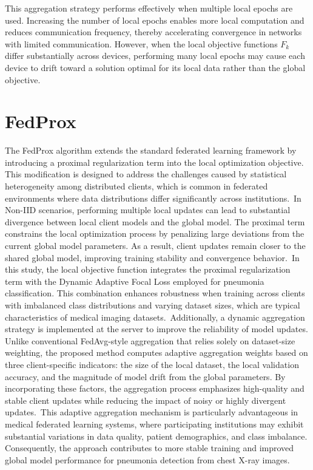 \documentclass[12pt]{book}
\begin{document}
This aggregation strategy performs effectively when multiple local epochs are used. Increasing the number of local epochs enables more local computation and reduces communication frequency, thereby accelerating convergence in networks with limited communication. However, when the local objective functions $F_k$ differ substantially across devices, performing many local epochs may cause each device to drift toward a solution optimal for its local data rather than the global objective.

\section{FedProx}

The FedProx algorithm extends the standard federated learning framework by introducing a proximal regularization term into the local optimization objective. This modification is designed to address the challenges caused by statistical heterogeneity among distributed clients, which is common in federated environments where data distributions differ significantly across institutions.\
In Non-IID scenarios, performing multiple local updates can lead to substantial divergence between local client models and the global model. The proximal term constrains the local optimization process by penalizing large deviations from the current global model parameters. As a result, client updates remain closer to the shared global model, improving training stability and convergence behavior.\
In this study, the local objective function integrates the proximal regularization term with the Dynamic Adaptive Focal Loss employed for pneumonia classification. This combination enhances robustness when training across clients with imbalanced class distributions and varying dataset sizes, which are typical characteristics of medical imaging datasets.\
Additionally, a dynamic aggregation strategy is implemented at the server to improve the reliability of model updates. Unlike conventional FedAvg-style aggregation that relies solely on dataset-size weighting, the proposed method computes adaptive aggregation weights based on three client-specific indicators: the size of the local dataset, the local validation accuracy, and the magnitude of model drift from the global parameters. By incorporating these factors, the aggregation process emphasizes high-quality and stable client updates while reducing the impact of noisy or highly divergent updates.\
This adaptive aggregation mechanism is particularly advantageous in medical federated learning systems, where participating institutions may exhibit substantial variations in data quality, patient demographics, and class imbalance. Consequently, the approach contributes to more stable training and improved global model performance for pneumonia detection from chest X-ray images.
\end{document}
